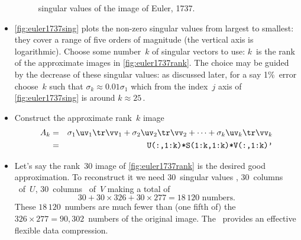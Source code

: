 \begin{example}
\begin{solution}
\begin{itemize}
\begin{figure}
\caption{singular values of the image of Euler, 1737.}
\label{fig:euler1737sing}
\centering

\end{figure}
\item \autoref{fig:euler1737sing} plots the non-zero singular values from largest to smallest: they cover a range of five orders of magnitude (the vertical axis is logarithmic).
Choose some number~\(k\) of singular vectors to use: \(k\)~is the rank of the approximate images in \autoref{fig:euler1737rank}.
The choice may be guided by the decrease of these singular values: as discussed later, for a say 1\%~error choose~\(k\) such that \(\sigma_k\approx 0.01\sigma_1\) which from the index~\(j\) axis of \autoref{fig:euler1737sing} is around \(k\approx 25\)\,.

\item Construct the approximate rank~\(k\) image
\begin{eqnarray*}
A_k&=&\sigma_1\uv_1\tr\vv_1+\sigma_2\uv_2\tr\vv_2+\cdots+\sigma_k\uv_k\tr\vv_k
\\&=&\verb|U(:,1:k)*S(1:k,1:k)*V(:,1:k)'|
\end{eqnarray*}

\item Let's say the rank~\(30\) image of \autoref{fig:euler1737rank} is the desired good approximation.  
To reconstruct it we need \(30\)~singular values \hlist{}, \(30\)~columns \hlist{}\ of~\(U\), \(30\)~columns \hlist{}\ of~\(V\) making a total of
\begin{equation*}
30+30\times326+30\times277=18\,120\text{ numbers}.
\end{equation*}
These \(18\,120\)~numbers are much fewer than (one fifth of) the \(326\times277=90,302\)~numbers of the original image.
The \svd\ provides an effective flexible data compression.
\end{itemize}
\end{solution}
\end{example}








